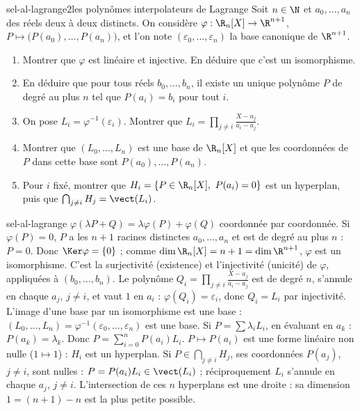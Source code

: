 \begin{exo}{sel-al-lagrange}{2}{les polynômes interpolateurs de Lagrange}
Soit $n\in\N$ et $a_0,\dots,a_n$ des réels deux à deux distincts. On considère $\varphi:\R_n[X]\to\R^{n+1}$,
$P\mapsto\big(P(a_0),\dots,P(a_n)\big)$, et l'on note $(\varepsilon_0,\dots,\varepsilon_n)$ la base canonique de $\R^{n+1}$.
\begin{enumerate}
\item Montrer que $\varphi$ est linéaire et injective. En déduire que c'est un isomorphisme.
\item En déduire que pour tous réels $b_0,\dots,b_n$, il existe un unique polynôme $P$ de degré au plus $n$ tel que $P(a_i)=b_i$
pour tout $i$.
\item On pose $L_i=\varphi^{-1}(\varepsilon_i)$. Montrer que $L_i=\prod_{j\neq i}\frac{X-a_j}{a_i-a_j}$.
\item Montrer que $(L_0,\dots,L_n)$ est une base de $\R_n[X]$ et que les coordonnées de $P$ dans cette base sont $P(a_0),\dots,P(a_n)$.
\item Pour $i$ fixé, montrer que $H_i=\{P\in\R_n[X],\ P(a_i)=0\}$ est un hyperplan, puis que $\bigcap_{j\neq i}H_j=\vect(L_i)$.
\end{enumerate}
\end{exo}

\begin{corrige}{sel-al-lagrange}
 $\varphi(\lambda P+Q)=\lambda\varphi(P)+\varphi(Q)$ coordonnée par coordonnée. Si $\varphi(P)=0$, $P$ a les $n+1$ racines distinctes
$a_0,\dots,a_n$ et est de degré au plus $n$ : $P=0$. Donc $\Ker\varphi=\{0\}$ ; comme $\dim\R_n[X]=n+1=\dim\R^{n+1}$, $\varphi$ est un
isomorphisme.
 C'est la surjectivité (existence) et l'injectivité (unicité) de $\varphi$, appliquées à $(b_0,\dots,b_n)$.
 Le polynôme $Q_i=\prod_{j\neq i}\frac{X-a_j}{a_i-a_j}$ est de degré $n$, s'annule en chaque $a_j$, $j\neq i$, et vaut $1$ en $a_i$ :
$\varphi(Q_i)=\varepsilon_i$, donc $Q_i=L_i$ par injectivité.
 L'image d'une base par un isomorphisme est une base : $(L_0,\dots,L_n)=\varphi^{-1}(\varepsilon_0,\dots,\varepsilon_n)$ est une base.
Si $P=\sum\lambda_iL_i$, en évaluant en $a_k$ : $P(a_k)=\lambda_k$. Donc $P=\sum_{i=0}^nP(a_i)L_i$.
 $P\mapsto P(a_i)$ est une forme linéaire non nulle ($1\mapsto1$) : $H_i$ est un hyperplan. Si $P\in\bigcap_{j\neq i}H_j$, ses
coordonnées $P(a_j)$, $j\neq i$, sont nulles : $P=P(a_i)L_i\in\vect(L_i)$ ; réciproquement $L_i$ s'annule en chaque $a_j$, $j\neq i$.
L'intersection de ces $n$ hyperplans est une droite : sa dimension $1=(n+1)-n$ est la plus petite possible.
\end{corrige}

